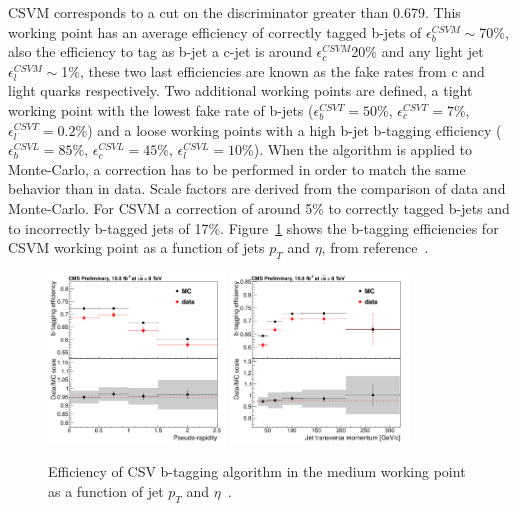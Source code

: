 CSVM corresponds to a cut on the discriminator greater than 0.679. This working point has an average efficiency of correctly tagged b-jets of $\epsilon^{CSVM}_{b}\sim$70\%, also the efficiency to tag as b-jet a c-jet is around $\epsilon^{CSVM}_{c}$20\% and any light jet $\epsilon^{CSVM}_{l}\sim$1\%, these two last efficiencies are known as the fake rates from c and light quarks respectively. Two additional working points are defined, a tight working point with the lowest fake rate of b-jets ($\epsilon^{CSVT}_{b}=50$\%, $\epsilon^{CSVT}_{c}=7$\%, $\epsilon^{CSVT}_{l}=0.2$\%) and a loose working points with a high b-jet b-tagging efficiency ($\epsilon^{CSVL}_{b}=85$\%, $\epsilon^{CSVL}_{c}=45$\%, $\epsilon^{CSVL}_{l}=10$\%). When the algorithm is applied to Monte-Carlo, a correction has to be performed in order to match the same behavior than in data. Scale factors are derived from the comparison of data and Monte-Carlo. For CSVM a correction of around 5\% to correctly tagged b-jets and to incorrectly b-tagged jets of 17\%. Figure~\ref{fig:CSVEff} shows the b-tagging efficiencies for CSVM working point as a function of jets $p_{T}$ and $\eta$, from reference~\cite{CMS-PAS-BTV-13-001}.  

\begin{figure}[!Hhtbp]
  \begin{center}
    \includegraphics[width=0.42\textwidth]{figs/LTdilep_csvMeffeta.png}
    \includegraphics[width=0.42\textwidth]{figs/LTdilep_csvMeffpt.png}
    \caption{Efficiency of CSV b-tagging algorithm in the medium working point as a function of jet $p_{T}$ and $\eta$~\cite{CMS-PAS-BTV-13-001}.}
    \label{fig:CSVEff}
  \end{center}
\end{figure}

